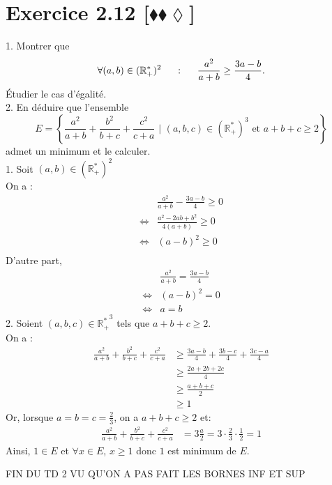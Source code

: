 \documentclass[10pt]{article}
\begin{document}
\section*{Exercice 2.12 [$\blacklozenge\blacklozenge\lozenge$]}
\begin{tcolorbox}[enhanced, width=7in, center, size=fbox, fontupper=\large, drop shadow southwest]
    1. Montrer que
    \begin{equation*}
        \forall(a,b)\in(\mathbb{R}^*_+)^2\hspace{0.5cm}:\hspace{0.5cm}\frac{a^2}{a+b}\geq\frac{3a-b}{4}.
    \end{equation*}
    Étudier le cas d'égalité.\\
    2. En déduire que l'ensemble
    \begin{equation*}
        E=\left\{\frac{a^2}{a+b}+\frac{b^2}{b+c}+\frac{c^2}{c+a} \text{ | } (a,b,c)\in(\mathbb{R^*_+})^3 \text{ et } a+b+c\geq2 \right\}
    \end{equation*}
    admet un minimum et le calculer.\\[0.5cm]
    1. Soit $(a,b)\in(\mathbb{R}^*_+)^2$\\
    On a :
    \begin{align*}
        &\frac{a^2}{a+b}-\frac{3a-b}{4}\geq0\\
        \iff&\frac{a^2-2ab+b^2}{4(a+b)}\geq0\\
        \iff&(a-b)^2\geq0\\
    \end{align*}
    D'autre part,
    \begin{align*}
        &\frac{a^2}{a+b}=\frac{3a-b}{4}\\
        \iff&(a-b)^2=0\\
        \iff&a=b
    \end{align*}
    2. Soient $(a,b,c)\in\mathbb{R^*_+}^3$ tels que $a+b+c\geq2$.\\
    On a :
    \begin{align*}
        \frac{a^2}{a+b}+\frac{b^2}{b+c}+\frac{c^2}{c+a}
        &\geq\frac{3a-b}{4}+\frac{3b-c}{4}+\frac{3c-a}{4}\\
        &\geq\frac{2a+2b+2c}{4}\\
        &\geq\frac{a+b+c}{2}\\
        &\geq1
    \end{align*}
    Or, lorsque $a=b=c=\frac{2}{3}$, on a $a+b+c\geq2$ et:
    \begin{align*}
        \frac{a^2}{a+b}+\frac{b^2}{b+c}+\frac{c^2}{c+a}
        &=3\frac{a}{2}=3\cdot\frac{2}{3}\cdot\frac{1}{2}=1
    \end{align*}
    Ainsi, $1\in E$ et $\forall{x\in E}$, $x\geq1$ donc $1$ est minimum de $E$.
\end{tcolorbox}

\begin{center}\LARGE{FIN DU TD 2 VU QU'ON A PAS FAIT LES BORNES INF ET SUP}\end{center}
\end{document}
